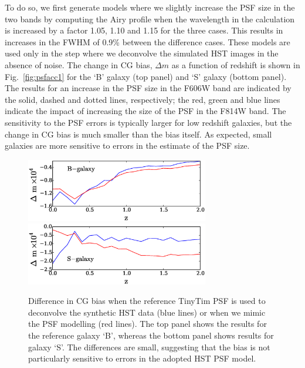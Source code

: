 \documentclass[useAMS,usenatbib]{mnras}
\begin{document}
To do so, we first generate models where we slightly increase the PSF size in the two bands by computing the  Airy profile when the wavelength in the calculation is increased by a factor 1.05, 1.10 and 1.15 for the three cases. This results in increases in the FWHM of 0.9\% between the difference cases.  These models are used only in the step where we deconvolve the simulated HST images in the absence of noise. The change in CG bias, $\Delta m$ as a function of redshift is shown in Fig.~\ref{fig:psfacc1} for the `B' galaxy (top panel) and `S' galaxy (bottom panel).  The results for an increase in the PSF size in  the F606W band are indicated by the solid, dashed and dotted lines, respectively; the red, green and blue lines indicate the impact of increasing the size of the PSF in the F814W band. The sensitivity to the PSF errors is typically larger for low redshift galaxies, but the change in CG bias is much smaller than the bias itself.  As expected, small galaxies are more sensitive to errors in the estimate of the PSF size.

\begin{figure}
\includegraphics[width=8.0cm]{ztinytim_b.eps}
\includegraphics[width=8.0cm]{ztinytim_s.eps}
\caption{Difference in CG bias when the reference {\sc TinyTim} PSF is used to deconvolve
the synthetic HST data (blue lines) or when we mimic the PSF modelling (red lines). The top
panel shows the results for the reference galaxy `B', whereas the bottom panel shows results
for galaxy `S'. The differences are small, suggesting that the bias is not particularly sensitive to
errors in the adopted HST PSF model.}
\label{fig:psfacc2}
\end{figure}
\end{document}

